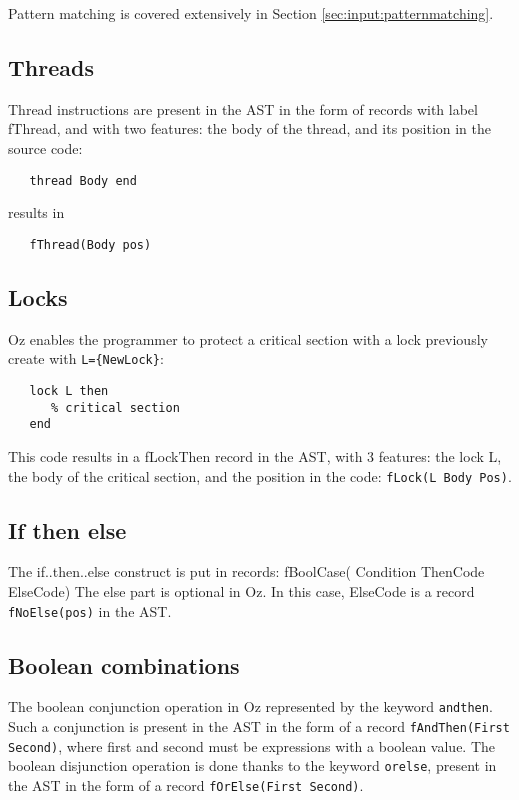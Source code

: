 \documentclass[a4paper]{memoir}
\begin{document}
Pattern matching is covered extensively in Section \ref{sec:input:patternmatching}.

\subsection{Threads}
Thread instructions are present in the AST in the form of records with label fThread, and with two features: the body of the thread, and its position in the source code:
\begin{lstlisting}
   thread Body end
\end{lstlisting}
results in
\begin{lstlisting}
   fThread(Body pos)
\end{lstlisting}
\subsection{Locks}\label{sec:input:locks}
Oz enables the programmer to protect a critical section with a lock previously create with \lstinline!L={NewLock}!:
\begin{lstlisting}
   lock L then
      % critical section
   end
\end{lstlisting}

This code results in a fLockThen record in the AST, with 3 features: the lock L,
the body of the critical section, and the position in the code:
\lstinline!fLock(L Body Pos)!.
\subsection{If then else}
The if..then..else construct is put in records:
fBoolCase( Condition ThenCode ElseCode)
The else part is optional in Oz. In this case, ElseCode is a record \lstinline!fNoElse(pos)! in the AST.
\subsection{Boolean combinations}\label{sec:input:booleancombinations}
The boolean conjunction operation in Oz represented by the keyword \lstinline!andthen!. Such a conjunction is present in the AST in the form of a record \lstinline!fAndThen(First Second)!, where first and second must be expressions with a boolean value.
The boolean disjunction operation is done thanks to the keyword \lstinline!orelse!, present in the AST in the form of a record \lstinline!fOrElse(First Second)!.
\end{document}
